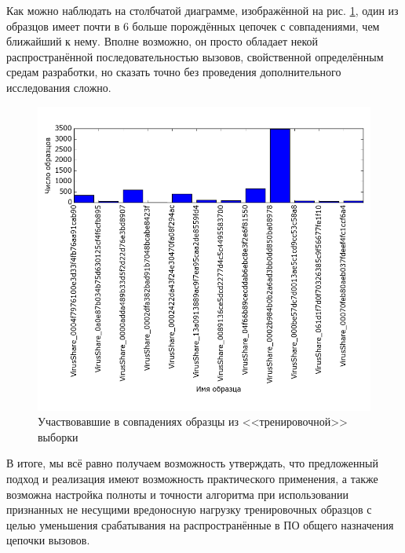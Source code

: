 Как можно наблюдать на столбчатой диаграмме, изображённой на рис. \ref {fig:efficiency}, один из образцов имеет почти в 6 больше порождённых цепочек с совпадениями, чем ближайший к нему. Вполне возможно, он просто обладает некой распространённой последовательностью вызовов, свойственной определённым средам разработки, но сказать точно без проведения дополнительного исследования сложно.
    
\begin {figure}[ht]
	\centering
	\includegraphics[width=\linewidth] {img/most_used_kbase_samples.png}
	\caption {Участвовавшие в совпадениях образцы из <<тренировочной>> выборки}
	\label {fig:efficiency}
\end {figure}

В итоге, мы всё равно получаем возможность утверждать, что предложенный подход и реализация имеют возможность практического применения, а также возможна настройка полноты и точности алгоритма при использовании признанных не несущими вредоносную нагрузку тренировочных образцов с целью уменьшения срабатывания на распространённые в ПО общего назначения цепочки вызовов.